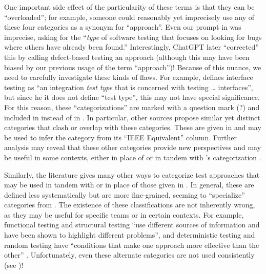 One important side effect of the particularity of these terms is that they can
be ``overloaded''; for example, someone could reasonably yet imprecisely use
any of these four categories as a synonym for ``approach''. Even our prompt in
\ifnotpaper \citep[emphasis added]{ChatGPT2024} \else \cite{ChatGPT2024} \fi was
imprecise, asking for the ``\emph{type} of software testing that focuses on
looking for bugs where others have already been found.'' Interestingly, ChatGPT
later ``corrected'' this by calling defect-based testing an approach (although
this may have been biased by our previous usage of the term ``approach'')!
Because of this nuance, we need to carefully investigate these kinds of
flaws. For example, \citet[p.~45\ifnotpaper, emphasis added\fi]{Kam2008}
defines interface testing as ``an integration \emph{test type} that is
concerned with testing \dots{} interfaces'', but since \ifnotpaper he \else it
\fi does not define ``test type'', this may not have special significance.
\ifnotpaper For this reason, these ``categorizations'' are marked with a
    question mark (?) and included in  instead of in
    . In particular, other sources
    \citep[such as][]{SWEBOK2024,BarbosaEtAl2006} propose similar yet distinct
    categories that clash or overlap with these categories. These are given in
     and may be used to infer the category from its ``IEEE
    Equivalent'' column. Further analysis may reveal that these other
    categories provide new perspectives and may be useful in some contexts,
    either in place of or in tandem with \citeauthor{IEEE2022}'s categorization
    \citeyearpar{IEEE2022}.

    Similarly, the literature gives many other ways to categorize test
    approaches that may be used in tandem with or in place of those given in
    . In general, these are defined less
    systematically but are more fine-grained, seeming to ``specialize''
    categories from . The existence of these classifications
    are not inherently wrong, as they may be useful for specific teams or in
    certain contexts. For example, functional testing and structural testing
    ``use different sources of information and have been shown to highlight
    different problems'', and deterministic testing and random testing have
    ``conditions that make one approach more effective than the other''
    \citep[p.~5\=/16]{SWEBOK2024}. Unfortunately, even these alternate
    categories are not used consistently (see )!

